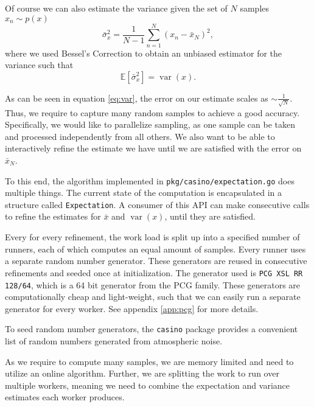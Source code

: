 \documentclass[10pt, a4paper]{article}
\begin{document}
  Of course we can also estimate the variance given the set of $N$ \iid{} samples $x_n \sim p(x)$
  \begin{equation}
  \bar{\sigma}_x^2 = \frac{1}{N-1} \sum_{n=1}^N (x_n - \bar{x}_N)^2,
  \end{equation}
  where we used Bessel's Correction\cite{nr} to obtain an unbiased estimator for the variance such
  that
  \begin{equation}
  \mathbb{E}\left[\bar{\sigma}_x^2\right] = \operatorname{var}(x).
  \end{equation}

  As can be seen in equation \ref{eq:var}, the error on our estimate scales as $\sim \frac{1}{\sqrt{N}}$.
  Thus, we require to capture many random samples to achieve a good accuracy. Specifically, we would
  like to parallelize sampling, as one \iid{} sample can be taken and processed independently from
  all others. We also want to be able to interactively refine the estimate we have until we are
  satisfied with the error on $\bar{x}_N$.

  To this end, the algorithm implemented in \texttt{pkg/casino/expectation.go} does multiple things.
  The current state of the computation is encapsulated in a structure called \texttt{Expectation}.
  A consumer of this API can make consecutive calls to refine the estimates for $\bar{x}$ and
  $\operatorname{var}(x)$, until they are satisfied.

  Every for every refinement, the work load is split up into a specified number of runners, each of
  which computes an equal amount of \iid{} samples. Every runner uses a separate random number generator.
  These generators are reused in consecutive refinements and seeded once at initialization. The
  generator used is \texttt{PCG XSL RR 128/64}, which is a 64 bit generator from the PCG family\cite{pcg}.
  These generators are computationally cheap and light-weight, such that we can easily run a
  separate generator for every worker. See appendix \ref{app:pcg} for more details.

  To seed random number generators, the \texttt{casino} package provides a convenient list of random numbers
  generated from atmospheric noise.

  As we require to compute many samples, we are memory limited and need to utilize an online
  algorithm\footnotemark. Further, we are splitting the work to run over multiple workers, meaning we
  need to combine the expectation and variance estimates each worker produces.
\end{document}
